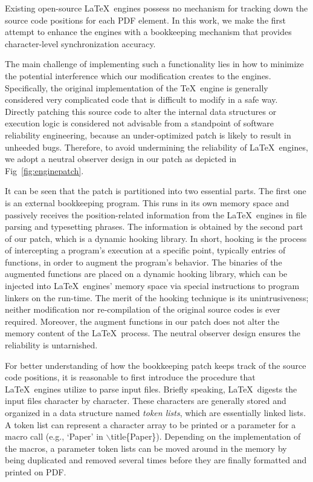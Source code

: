 \documentclass[sigconf]{acmart}
\begin{document}

Existing open-source \LaTeX\ engines possess no mechanism for tracking down the source code positions for each PDF element. 
In this work, we make the first attempt to enhance the engines with a bookkeeping mechanism that provides character-level synchronization accuracy.

The main challenge of implementing such a functionality lies in how to minimize the potential interference which our modification creates to the engines. 
Specifically, the original implementation of the \TeX\ engine is generally considered very complicated code that is difficult to modify in a safe way.  
Directly patching this source code  to alter the internal data structures or execution logic is considered not advisable from a standpoint of software reliability engineering, because an under-optimized patch is likely to result in unheeded bugs.
Therefore, to avoid undermining the reliability of \LaTeX\ engines, we adopt a neutral observer design in our patch as depicted in Fig~\ref{fig:enginepatch}.

It can be seen that the patch is partitioned into two essential parts. The first one is an external bookkeeping program. 
This runs in its own memory space and passively receives the position-related information from the \LaTeX\ engines in file parsing and typesetting phrases.
The information is obtained by the second part of our patch, which is a dynamic hooking library. 
In short, hooking is the process of intercepting a program's execution at a specific point, typically entries of functions, in order to augment the program's behavior. 
The binaries of the augmented functions are placed on a dynamic hooking library, which can be injected into \LaTeX\ engines' memory space via special instructions to program linkers on the run-time. 
The merit of the hooking technique is its unintrusiveness; neither modification nor re-compilation of the original source codes is ever required. 
Moreover, the augment functions in our patch does not alter the memory content of the \LaTeX\ process. The neutral observer design ensures the reliability is untarnished.

For better understanding of how the bookkeeping patch keeps track of the source code positions, it is reasonable to first introduce the procedure that \LaTeX\ engines utilize to parse input files. Briefly speaking, \LaTeX\ digests the input files character by character. 
These characters are generally stored and organized in a data structure named \textit{token lists}, which are essentially linked lists. 
A token list can represent a character array to be printed or a parameter for a macro call (e.g., `Paper' in $\backslash$title\{Paper\}). 
Depending on the implementation of the macros, a parameter token lists can be moved around in the memory by being duplicated and removed several times before they are finally formatted and printed on PDF.
\end{document}
